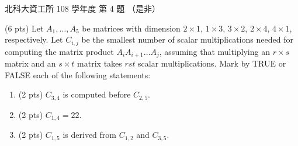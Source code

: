 \begin{pastexam}[label={px:ntut-108-ci-06}]{北科大資工所 108 學年度 第 4 題}
（是非）

(6 pts) Let $A_1,\ldots,A_5$ be matrices with dimension $2\times1$, $1\times3$, $3\times2$, $2\times4$,
$4\times1$, respectively. Let $C_{i,j}$ be the smallest number of scalar multiplications needed for
computing the matrix product $A_iA_{i+1}\ldots A_j$, assuming that multiplying an $r\times s$ matrix
and an $s\times t$ matrix takes $rst$ scalar multiplications. Mark by TRUE or FALSE each of the
following statements:
\begin{enumerate}[label=(\arabic*)]
\item (2 pts) $C_{3,4}$ is computed before $C_{2,5}$.
\item (2 pts) $C_{1,4}=22$.
\item (2 pts) $C_{1,5}$ is derived from $C_{1,2}$ and $C_{3,5}$.
\end{enumerate}
\end{pastexam}

